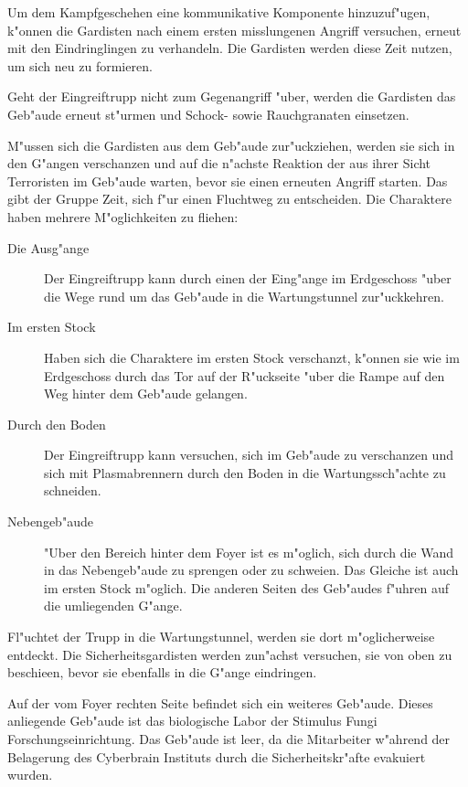 Um dem Kampfgeschehen eine kommunikative Komponente hinzuzuf"ugen, k"onnen die Gardisten nach einem ersten misslungenen Angriff versuchen, erneut mit den Eindringlingen zu verhandeln. Die Gardisten werden diese Zeit nutzen, um sich neu zu formieren.

Geht der Eingreiftrupp nicht zum Gegenangriff "uber, werden die Gardisten das Geb"aude erneut st"urmen und Schock- sowie Rauchgranaten einsetzen.

M"ussen sich die Gardisten aus dem Geb"aude zur"uckziehen, werden sie sich in den G"angen verschanzen und auf die n"achste Reaktion der aus ihrer Sicht Terroristen im Geb"aude warten, bevor sie einen erneuten Angriff starten. Das gibt der Gruppe Zeit, sich f"ur einen Fluchtweg zu entscheiden. Die Charaktere haben mehrere M"oglichkeiten zu fliehen:

\begin{description}
	\item [Die Ausg"ange] Der Eingreiftrupp kann durch einen der Eing"ange im Erdgeschoss "uber die Wege rund um das Geb"aude in die 
		Wartungstunnel zur"uckkehren.
	\item [Im ersten Stock] Haben sich die Charaktere im ersten Stock verschanzt, k"onnen sie wie im Erdgeschoss durch das Tor auf der
		R"uckseite "uber die Rampe auf den Weg hinter dem Geb"aude gelangen.
	\item [Durch den Boden] Der Eingreiftrupp kann versuchen, sich im Geb"aude zu verschanzen und sich mit Plasmabrennern durch den Boden in	
		die Wartungssch"achte zu schneiden.
	\item [Nebengeb"aude] "Uber den Bereich hinter dem Foyer ist es m"oglich, sich durch die Wand in das Nebengeb"aude zu sprengen oder zu	
		schwei\3en. Das Gleiche ist auch im ersten Stock m"oglich. Die anderen Seiten des Geb"audes f"uhren auf die umliegenden G"ange.
\end{description}

Fl"uchtet der Trupp in die Wartungstunnel, werden sie dort m"oglicherweise entdeckt. Die Sicherheitsgardisten werden zun"achst versuchen, sie von oben zu beschie\3en, bevor sie ebenfalls in die G"ange eindringen.

Auf der vom Foyer rechten Seite befindet sich ein weiteres Geb"aude. Dieses anliegende Geb"aude ist das biologische Labor der Stimulus Fungi Forschungseinrichtung. Das Geb"aude ist leer, da die Mitarbeiter w"ahrend der Belagerung des Cyberbrain Instituts durch die Sicherheitskr"afte evakuiert wurden.

